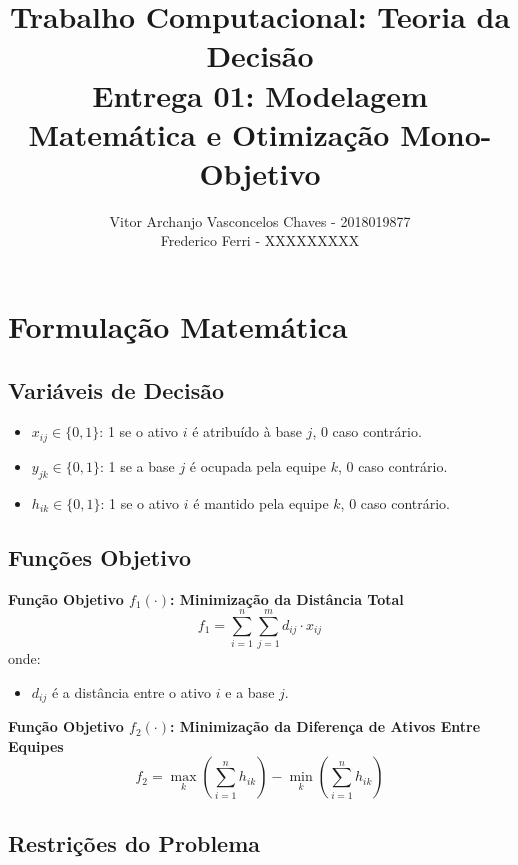\documentclass[10pt]{article}
\title{Trabalho Computacional: Teoria da Decisão \\
Entrega 01: Modelagem Matemática e Otimização Mono-Objetivo}
\author{Vitor Archanjo Vasconcelos Chaves - 2018019877 \\ Frederico Ferri - XXXXXXXXX}
\date{}
\begin{document}
\maketitle

\section{Formulação Matemática}

\subsection{Variáveis de Decisão}
\begin{itemize}
    \item $x_{ij} \in \{0, 1\}$: 1 se o ativo $i$ é atribuído à base $j$, 0 caso contrário.
    \item $y_{jk} \in \{0, 1\}$: 1 se a base $j$ é ocupada pela equipe $k$, 0 caso contrário.
    \item $h_{ik} \in \{0, 1\}$: 1 se o ativo $i$ é mantido pela equipe $k$, 0 caso contrário.
\end{itemize}

\subsection{Funções Objetivo}

\textbf{Função Objetivo $f_1(\cdot)$: Minimização da Distância Total}
\[
f_1 = \sum_{i=1}^{n} \sum_{j=1}^{m} d_{ij} \cdot x_{ij}
\]
onde:
\begin{itemize}
    \item $d_{ij}$ é a distância entre o ativo $i$ e a base $j$.
\end{itemize}

\textbf{Função Objetivo $f_2(\cdot)$: Minimização da Diferença de Ativos Entre Equipes}
\[
f_2 = \max_{k}\left(\sum_{i=1}^{n} h_{ik}\right) - \min_{k}\left(\sum_{i=1}^{n} h_{ik}\right)
\]

\subsection{Restrições do Problema}
\end{document}
